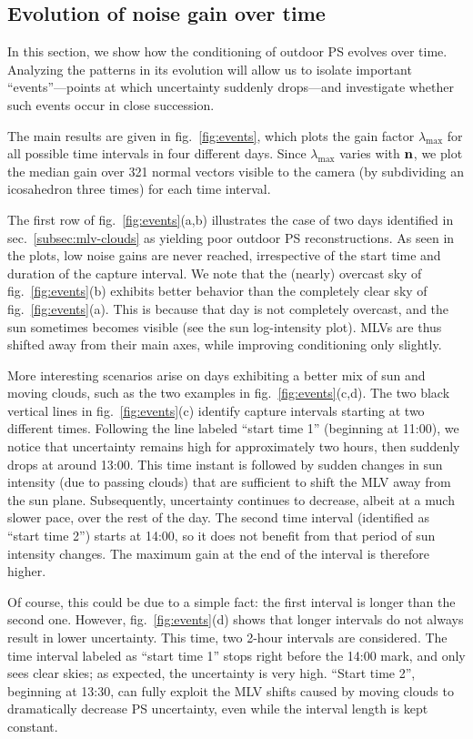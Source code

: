 \subsection{Evolution of noise gain over time}

In this section, we show how the conditioning of outdoor PS evolves over time. Analyzing the patterns in its evolution will allow us to isolate important ``events''---points at which uncertainty suddenly drops---and investigate whether such events occur in close succession.

The main results are given in fig.~\ref{fig:events}, which plots the gain factor $\lambda_{\max}$ for all possible time intervals in four different days. Since $\lambda_{\max}$ varies with ${\bf n}$, we plot the median gain over 321 normal vectors visible to the camera (by subdividing an icosahedron three times) for each time interval.

The first row of fig.~\ref{fig:events}(a,b) illustrates the case of two days identified in sec.~\ref{subsec:mlv-clouds} as yielding poor outdoor PS reconstructions. As seen in the plots, low noise gains are never reached, irrespective of the start time and duration of the capture interval. We note that the (nearly) overcast sky of fig.~\ref{fig:events}(b) exhibits better behavior than the completely clear sky of fig.~\ref{fig:events}(a). This is because that day is not completely overcast, and the sun sometimes becomes visible (see the sun log-intensity plot). MLVs are thus shifted away from their main axes, while improving conditioning only slightly.

More interesting scenarios arise on days exhibiting a better mix of sun and moving clouds, such as the two examples in fig.~\ref{fig:events}(c,d). The two black vertical lines in fig.~\ref{fig:events}(c) identify capture intervals starting at two different times. Following the line labeled ``start time 1'' (beginning at 11:00), we notice that uncertainty remains high for approximately two hours, then suddenly drops at around 13:00. This time instant is followed by sudden changes in sun intensity (due to passing clouds) that are sufficient to shift the MLV away from the sun plane. Subsequently, uncertainty continues to decrease, albeit at a much slower pace, over the rest of the day. The second time interval (identified as ``start time 2'') starts at 14:00, so it does not benefit from that period of sun intensity changes. The maximum gain at the end of the interval is therefore higher. 

Of course, this could be due to a simple fact: the first interval is longer than the second one. However, fig.~\ref{fig:events}(d) shows that longer intervals do not always result in lower uncertainty. This time, two 2-hour intervals are considered. The time interval labeled as ``start time 1'' stops right before the 14:00 mark, and only sees clear skies; as expected, the uncertainty is very high. ``Start time 2'', beginning at 13:30, can fully exploit the MLV shifts caused by moving clouds to dramatically decrease PS uncertainty, even while the interval length is kept constant.
  
